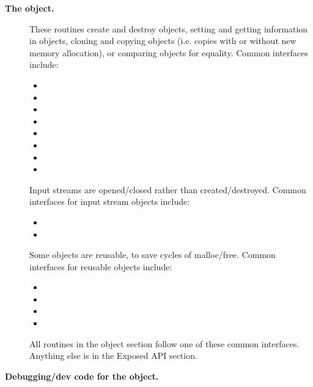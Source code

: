 \begin{description}

\item[\textbf{The  object.}]

  These routines create and destroy objects, setting and getting
  information in objects, cloning and copying objects (i.e.  copies
  with or without new memory allocation), or comparing objects for
  equality. Common interfaces include:

  \begin{itemize}
      \item {}
      \item {}
      \item {}
      \item {}
      \item {}
      \item {}
      \item {}
      \item {}
  \end{itemize}

  Input streams are opened/closed rather than created/destroyed.
  Common interfaces for input stream objects include:

  \begin{itemize}
      \item {}
      \item {}
  \end{itemize}

  Some objects are reusable, to save cycles of malloc/free.
  Common interfaces for reusable objects include:

  \begin{itemize}
      \item {}
      \item {}
      \item {}
      \item {}
  \end{itemize}

  All routines in the object section follow one of these common
  interfaces. Anything else is in the Exposed API section.

\item[\textbf{Debugging/dev code for the object.}]


\end{description}

